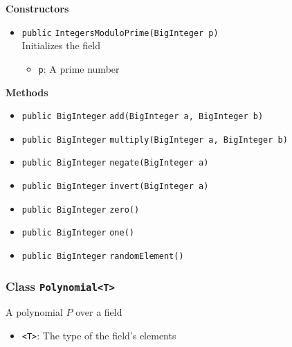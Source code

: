 \textbf{Constructors}
\begin{itemize}
\item \lstinline|public| \lstinline|IntegersModuloPrime|\lstinline|(BigInteger p)|\\
Initializes the field
\begin{itemize}
\item \lstinline|p|: A prime number
\end{itemize}



\end{itemize}


\textbf{Methods}
\begin{itemize}
\item \lstinline|public BigInteger| \lstinline|add|\lstinline|(BigInteger a, BigInteger b)|




\item \lstinline|public BigInteger| \lstinline|multiply|\lstinline|(BigInteger a, BigInteger b)|




\item \lstinline|public BigInteger| \lstinline|negate|\lstinline|(BigInteger a)|




\item \lstinline|public BigInteger| \lstinline|invert|\lstinline|(BigInteger a)|




\item \lstinline|public BigInteger| \lstinline|zero|\lstinline|()|




\item \lstinline|public BigInteger| \lstinline|one|\lstinline|()|




\item \lstinline|public BigInteger| \lstinline|randomElement|\lstinline|()|




\end{itemize}

\subsubsection{Class \lstinline|Polynomial<T>|}
A polynomial $P$ over a field \\


\begin{itemize}
\item \lstinline|<T>|: The type of the field's elements
\end{itemize}


